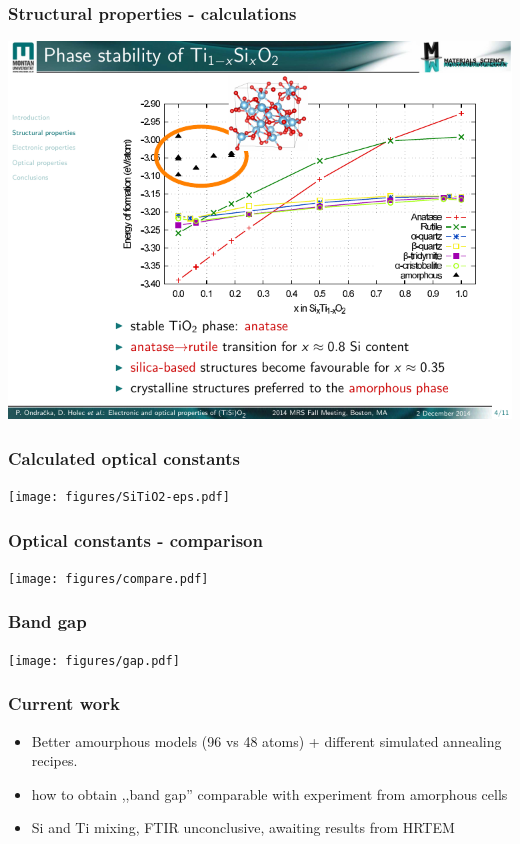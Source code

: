 \documentclass{beamer}
\begin{document}
\begin{frame}
\frametitle{Structural properties - calculations}
	\includegraphics[width=\linewidth]{figures/stability.pdf}
\end{frame}

\begin{frame}
\frametitle{Calculated optical constants}
	\texttt{[image: figures/SiTiO2-eps.pdf]}
\end{frame}

\begin{frame}
\frametitle{Optical constants - comparison}
	\texttt{[image: figures/compare.pdf]}
\end{frame}

\begin{frame}
\frametitle{Band gap}
	\texttt{[image: figures/gap.pdf]}
\end{frame}

\begin{frame}
\frametitle{Current work}
\begin{itemize}
   \item Better amourphous models (96 vs 48 atoms) + different simulated annealing recipes.
   \item how to obtain ,,band gap'' comparable with experiment from amorphous cells
   \item Si and Ti mixing, FTIR unconclusive, awaiting results from HRTEM
\end{itemize}
\end{frame}
\end{document}
